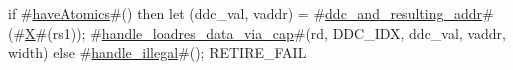 if #\hyperref[sailRISCVzhaveAtomics]{haveAtomics}#() then {
  let (ddc_val, vaddr) = #\hyperref[sailRISCVzddczyandzyresultingzyaddr]{ddc\_and\_resulting\_addr}#(#\hyperref[sailRISCVzX]{X}#(rs1));
  #\hyperref[sailRISCVzhandlezyloadreszydatazyviazycap]{handle\_loadres\_data\_via\_cap}#(rd, DDC_IDX, ddc_val, vaddr, width)
} else {
  #\hyperref[sailRISCVzhandlezyillegal]{handle\_illegal}#();
  RETIRE_FAIL
}
